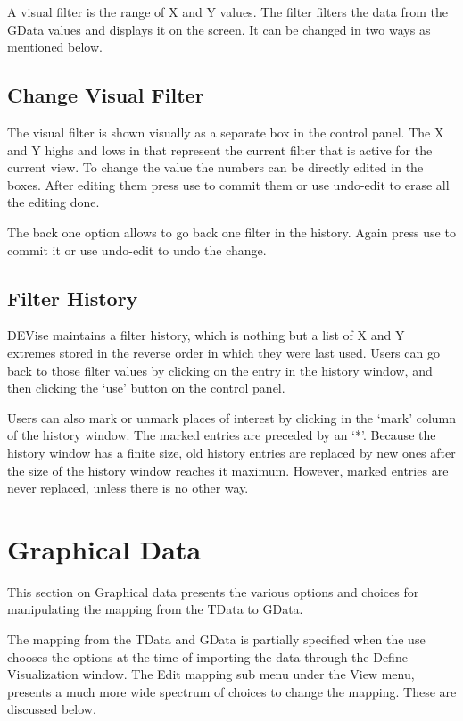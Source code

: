 A visual filter is the range of X and Y values. The filter filters the data from the GData values and displays it on the screen. It can be changed in two ways as mentioned below.

\subsection{Change Visual Filter}

The visual filter is shown visually as a separate box in the control panel. The X and Y highs and lows in that represent the current filter that is active for the current view. To change the value the numbers can be directly edited in the boxes. After editing them press use to commit them or use undo-edit to erase all the editing done. 

The back one option allows to go back one filter in the history. Again press use to commit it or use undo-edit to undo the change.

\subsection{Filter History}

DEVise maintains a filter history, which is nothing but a list of X and Y extremes stored in the reverse order in which they were last used. Users can go back to those filter values by clicking on the entry in the  history window, and then clicking the `use' button on the control panel. 

Users can also mark or unmark places of interest by clicking in the `mark' column of the history window. The marked entries are preceded by an `*'.  Because the history window has a finite size, old history entries are replaced by new ones after the size of the history window reaches it maximum. However, marked entries are never replaced, unless there is no other way. 

\section{Graphical Data}

This section on Graphical data presents the various options and choices for manipulating the mapping from the TData to GData.

The mapping from the TData and GData is partially specified when the use chooses the options at the time of importing the data through the Define Visualization window. The Edit mapping sub menu under the View menu, presents a much more wide spectrum of choices to change the mapping. These are discussed below.

